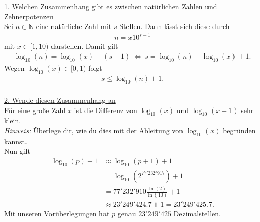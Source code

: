 \underline{1. Welchen Zusammenhang gibt es zwischen natürlichen Zahlen und Zehnerpotenzen}\\
Sei $ n \in \mathbb{N} $ eine natürliche Zahl mit $ s $ Stellen.
Dann lässt sich diese durch 
\begin{align*}
n = x 10^{s-1}
\end{align*}
mit $ x \in [1,10) $ darstellen.
Damit gilt
\begin{align*}
\log_{10} (n) = \log_{10} (x) + (s-1) 
\ \Leftrightarrow \
s = \log_{10}(n) - \log_{10}(x) + 1.
\end{align*}
Wegen $ \log_{10}(x) \in [0,1) $ folgt 
\begin{align*}
s \leq \log_{10}(n) +1.
\end{align*}
\ \\
\underline{2. Wende diesen Zusammenhang an}\\
Für eine große Zahl $ x $ ist die Differenz 
von $ \log_{10}(x) $ und $ \log_{10}(x+1) $ sehr klein.\\
\textit{Hinweis:} Überlege dir, wie du dies mit der Ableitung von $ \log_{10}(x)  $ begründen kannst.\\
Nun gilt 
\begin{align*}
\log_{10}(p) +1 
&\approx
\log_{10}(p+1) +1\\
&=
\log_{10}(2^{77'232'917}) +1\\
&=
77'232'910 \frac{\ln(2)}{\ln(10)}+ 1 \\
&\approx
23'249'424.7 + 1
= 23'249'425.7.
\end{align*}
Mit unseren Vorüberlegungen hat $ p $ genau $ 23'249'425 $ Dezimalstellen.



\newpage
